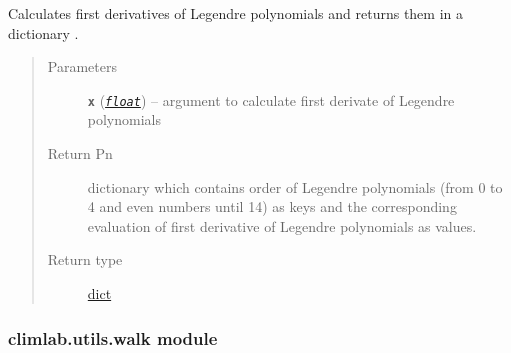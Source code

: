 \documentclass[a4paper,10pt,english]{sphinxmanual}
\begin{document}

\begin{fulllineitems}
\label{api/climlab.utils:climlab.utils.legendre.Pnprime}
Calculates first derivatives of Legendre polynomials and returns them 
in a dictionary .
\begin{quote}\begin{description}
\item[{Parameters}] \leavevmode
\textbf{\texttt{x}} (\href{http://docs.python.org/2.7/library/functions.html\#float}{\emph{\texttt{float}}}) -- argument to calculate first derivate of Legendre polynomials

\item[{Return Pn}] \leavevmode
dictionary which contains order of Legendre polynomials
(from 0 to 4 and even numbers until 14) as keys and 
the corresponding evaluation of first derivative of 
Legendre polynomials as values.

\item[{Return type}] \leavevmode
\href{http://docs.python.org/2.7/library/stdtypes.html\#dict}{dict}

\end{description}\end{quote}

\end{fulllineitems}



\subsubsection{climlab.utils.walk module}
\label{api/climlab.utils:module-climlab.utils.walk}\label{api/climlab.utils:climlab-utils-walk-module}
\end{document}

